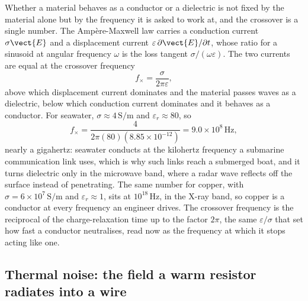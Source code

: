 Whether a material behaves as a conductor or a dielectric is not fixed by
the material alone but by the frequency it is asked to work at, and the
crossover is a single number. The Amp\`ere-Maxwell law carries a conduction
current $\sigma\vect{E}$ and a displacement current $\varepsilon\,\partial
\vect{E}/\partial t$, whose ratio for a sinusoid at angular frequency
$\omega$ is the loss tangent $\sigma/(\omega\varepsilon)$. The two currents
are equal at the crossover frequency
\[
f_{\times} = \frac{\sigma}{2\pi\varepsilon},
\]
above which displacement current dominates and the material passes waves as
a dielectric, below which conduction current dominates and it behaves as a
conductor. For seawater, $\sigma \approx 4\,\si{\siemens\per\meter}$ and
$\varepsilon_r \approx 80$, so
\[
f_{\times} = \frac{4}{2\pi(80)(8.85\times 10^{-12})} = 9.0\times 10^{8}\,
\si{\hertz},
\]
nearly a gigahertz: seawater conducts at the kilohertz frequency a
submarine communication link uses, which is why such links reach a
submerged boat, and it turns dielectric only in the microwave band, where a
radar wave reflects off the surface instead of penetrating. The same number
for copper, with $\sigma = 6\times 10^{7}\,\si{\siemens\per\meter}$ and
$\varepsilon_r \approx 1$, sits at $10^{18}\,\si{\hertz}$, in the X-ray
band, so copper is a conductor at every frequency an engineer drives. The
crossover frequency is the reciprocal of the charge-relaxation time up to
the factor $2\pi$, the same $\varepsilon/\sigma$ that set how fast a
conductor neutralises, read now as the frequency at which it stops acting
like one.

\subsection{Thermal noise: the field a warm resistor radiates into a wire}

